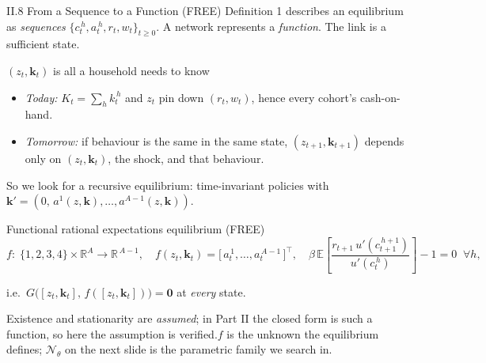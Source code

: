 \documentclass[aspectratio=169,11pt]{beamer}
\newcommand{\emphc}[1]{\textcolor{harvardcrimson}{#1}}
\newcommand{\R}{\mathbb{R}}
\newcommand{\E}[1]{\mathbb{E}\!\left[#1\right]}
\newcommand{\N}{\mathcal{N}}
\begin{document}
\begin{frame}{II.8 From a Sequence to a Function (FREE)}
\scriptsize
Definition 1 describes an equilibrium as \emph{sequences} $\{c_t^{\,h}, a_t^{\,h}, r_t, w_t\}_{t\ge 0}$.
A network represents a \emph{function}.  The link is a sufficient state.

\vspace{-2pt}
\begin{block}{$(z_t,\bm{k}_t)$ is all a household needs to know}
\vspace{-3pt}\begin{itemize}\itemsep0pt
    \item \emph{Today:} $K_t=\sum_h k_t^{\,h}$ and $z_t$ pin down $(r_t,w_t)$, hence every cohort's cash-on-hand.
    \item \emph{Tomorrow:} if behaviour is the same in the same state, $(z_{t+1},\bm{k}_{t+1})$ depends only on
          $(z_t,\bm{k}_t)$, the shock, and that behaviour.
\end{itemize}
\vspace{-3pt}
\end{block}
\vspace{-3pt}
So we look for a \emphc{recursive} equilibrium: time-invariant policies with $\bm{k}' = (0,\,a^1(z,\bm{k}),\ldots,a^{A-1}(z,\bm{k}))$.

\vspace{-1pt}
\begin{exampleblock}{Functional rational expectations equilibrium (FREE)}
\vspace{-6pt}
\[
f:\;\{1,2,3,4\}\times \R^{A} \to \R^{\,A-1},
\quad
f(z_t, \bm{k}_t) = \bigl[\,a_t^{\,1},\ldots,a_t^{\,A-1}\,\bigr]^{\!\top},
\quad
\beta\,\E{\frac{r_{t+1}\,u'(c_{t+1}^{\,h+1})}{u'(c_t^{\,h})}} - 1 = 0 \;\;\forall h,
\]
\vspace{-9pt}
\begin{center}i.e.\ $G\bigl([z_t,\bm{k}_t],\,f([z_t,\bm{k}_t])\bigr)=\bm{0}$ at \emph{every} state.\end{center}
\vspace{-6pt}\end{exampleblock}
\vspace{-3pt}
{\scriptsize Existence and stationarity are \emph{assumed}; in Part II the closed form is such a function, so here the assumption is verified.\quad \emphc{$f$ is the unknown the equilibrium defines; $\N_\theta$ on the next slide is the parametric family we search in.}}
\end{frame}
\end{document}
